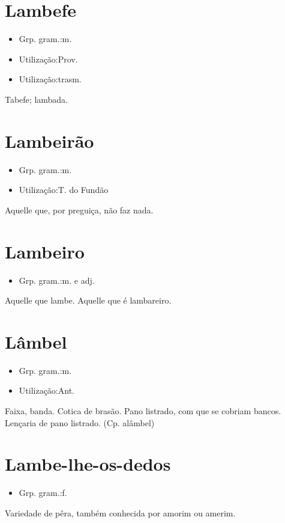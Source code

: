 \section{Lambefe}
\begin{itemize}
\item {Grp. gram.:m.}
\end{itemize}
\begin{itemize}
\item {Utilização:Prov.}
\end{itemize}
\begin{itemize}
\item {Utilização:trasm.}
\end{itemize}
Tabefe; lambada.
\section{Lambeirão}
\begin{itemize}
\item {Grp. gram.:m.}
\end{itemize}
\begin{itemize}
\item {Utilização:T. do Fundão}
\end{itemize}
Aquelle que, por preguiça, não faz nada.
\section{Lambeiro}
\begin{itemize}
\item {Grp. gram.:m.  e  adj.}
\end{itemize}
Aquelle que lambe.
Aquelle que é lambareiro.
\section{Lâmbel}
\begin{itemize}
\item {Grp. gram.:m.}
\end{itemize}
\begin{itemize}
\item {Utilização:Ant.}
\end{itemize}
Faixa, banda.
Cotica de brasão.
Pano listrado, com que se cobriam bancos.
Lençaria de pano listrado.
(Cp. \textunderscore alâmbel\textunderscore )
\section{Lambe-lhe-os-dedos}
\begin{itemize}
\item {Grp. gram.:f.}
\end{itemize}
Variedade de pêra, também conhecida por amorim ou amerim.
